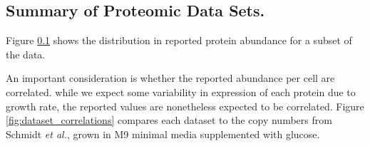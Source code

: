 \subsection{Summary of Proteomic Data Sets.}


Figure \ref{} shows the distribution in reported protein abundance for   a  subset
of  the data.

An important consideration is whether the reported abundance per cell are correlated. while
we expect some variability in expression of each protein due to growth rate, the reported
values are nonetheless expected to be correlated. Figure \ref{fig:dataset_correlations} compares each dataset to the copy numbers from Schmidt \textit{et al.}, grown in M9 minimal media supplemented with glucose.






%

%
%
